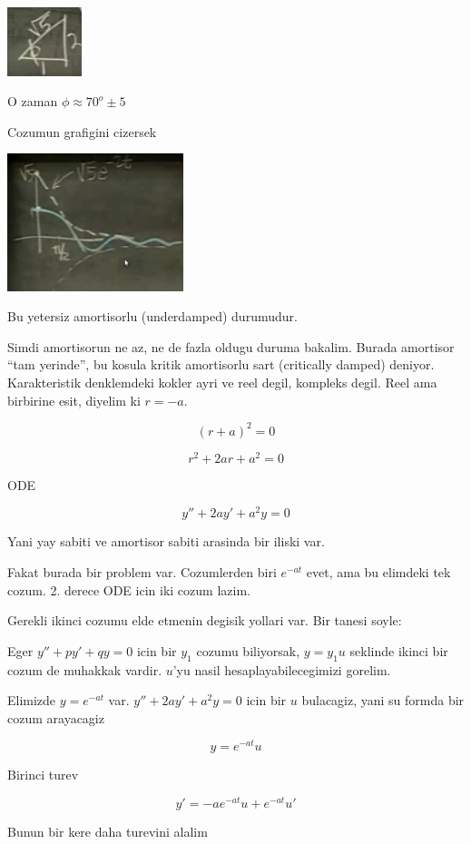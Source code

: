 \documentclass[12pt,fleqn]{article}\usepackage{../common}
\begin{document}
\includegraphics[height=2cm]{9_3.png}

O zaman $\phi \approx 70^{o} \pm 5$

Cozumun grafigini cizersek

\includegraphics[height=4cm]{9_4.png}

Bu yetersiz amortisorlu (underdamped) durumudur. 

Simdi amortisorun ne az, ne de fazla oldugu duruma bakalim. Burada
amortisor ``tam yerinde'', bu kosula kritik amortisorlu sart (critically
damped) deniyor. Karakteristik denklemdeki kokler ayri ve reel degil,
kompleks degil. Reel ama birbirine esit, diyelim ki $r = -a$. 

\[ (r+a)^2 = 0 \]

\[ r^2 + 2ar + a^2 = 0 \]

ODE

\[ y'' + 2ay' + a^2y = 0 \]

Yani yay sabiti ve amortisor sabiti arasinda bir iliski var. 

Fakat burada bir problem var. Cozumlerden biri $e^{-at}$ evet, ama bu
elimdeki tek cozum. 2. derece ODE icin iki cozum lazim. 

Gerekli ikinci cozumu elde etmenin degisik yollari var. Bir tanesi soyle:

Eger $y'' + py' + qy = 0$ icin bir $y_1$ cozumu biliyorsak, $y = y_1 u$
seklinde ikinci bir cozum de muhakkak vardir. $u$'yu nasil
hesaplayabilecegimizi gorelim.

Elimizde $y = e^{-at}$ var. $y'' + 2ay' + a^2y = 0$ icin bir $u$ bulacagiz,
yani su formda bir cozum arayacagiz

\[ y = e^{-at} u \]

Birinci turev

\[ y' = -a e^{-at}u + e^{-at} u' \]

Bunun bir kere daha turevini alalim
\end{document}
